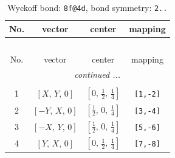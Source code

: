 \documentclass[fleqn,8pt]{jsarticle}
\begin{document}
\renewcommand{\arraystretch}{1.2}
\begin{longtable}{cccc}
\caption{Wyckoff bond: {\tt 8f@4d}, bond symmetry: {\tt 2..}}
 \\
 \hline \hline
No. & vector & center & mapping \\ \hline \endfirsthead

\multicolumn{3}{l}{\tablename\ \thetable{}} \\
 \hline \hline
No. & vector & center & mapping \\ \hline \endhead

 \hline \hline
\multicolumn{3}{r}{\footnotesize\it continued ...} \\ \endfoot

 \hline \hline
\multicolumn{3}{r}{} \\ \endlastfoot

1 & $\left[ X,\, Y,\, 0 \right]$ & $\left[ 0,\, \frac{1}{2},\, \frac{1}{4} \right]$ & {\tt [1,-2]} \\ \hline
2 & $\left[ - Y,\, X,\, 0 \right]$ & $\left[ \frac{1}{2},\, 0,\, \frac{1}{4} \right]$ & {\tt [3,-4]} \\ \hline
3 & $\left[ - X,\, Y,\, 0 \right]$ & $\left[ \frac{1}{2},\, 0,\, \frac{1}{4} \right]$ & {\tt [5,-6]} \\ \hline
4 & $\left[ Y,\, X,\, 0 \right]$ & $\left[ 0,\, \frac{1}{2},\, \frac{1}{4} \right]$ & {\tt [7,-8]} \\
\end{longtable}
\renewcommand{\arraystretch}{1.2}
\end{document}
